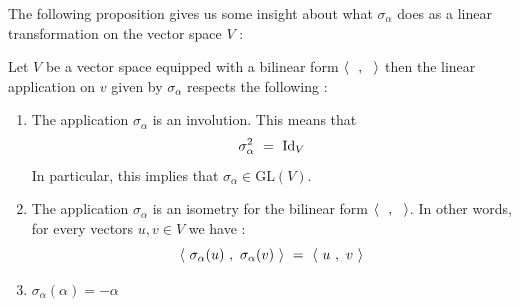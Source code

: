 The following proposition gives us some insight about what $\sigma_\alpha$ does as a linear transformation on the vector space $V$ :
\begin{proposition}\label{les sigma definisse une isometrie.}
	Let $V$ be a vector space equipped with a bilinear form $\langle\text{ } \text{ },\text{ }\text{ }\rangle$ then the linear application on $v$ given by $\sigma_\alpha$ respects the following :
	\begin{enumerate}
		\item The application $\sigma_\alpha$ is an involution. This means that \begin{equation}
		\sigma^2_\alpha\text{ } =\text{ } \mbox{Id}_V
		\end{equation}
		 In particular, this implies that $\sigma_\alpha \in \mbox{GL}(V)$.
		\item The application $\sigma_\alpha$ is an isometry for the bilinear form $\langle\text{ } \text{ },\text{ }\text{ }\rangle$. In other words, for every vectors $u,v\in V$ we have :
		\begin{equation}
		\langle\text{ } \sigma_\alpha(u)\text{ },\text{ }\sigma_\alpha(v)\text{ }\rangle\text{ }=\text{ } \langle\text{ } u\text{ },\text{ } v\text{ }\rangle
		\end{equation}
		\item $\sigma_\alpha(\alpha)=-\alpha$
	\end{enumerate}
\end{proposition}
